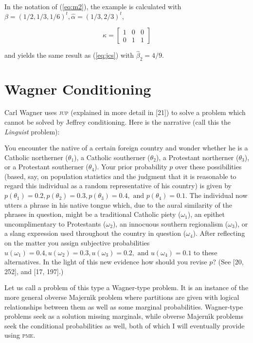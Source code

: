 {\noindent}In the notation of (\ref{eq:m2}), the example is calculated
with $\beta=(1/2,1/3,1/6)^{t},\hat{\alpha}=(1/3,2/3)^{t}$,

\begin{equation}
  \label{eq:kappa}
  \kappa=\left[
  \begin{array}{ccc}
    1 & 0 & 0 \\
    0 & 1 & 1
  \end{array}\right]
\end{equation}

{\noindent}and yields the same result as (\ref{eq:jcs}) with
$\hat{\beta}_{2}=4/9$.

\section{Wagner Conditioning}
\label{wc}

Carl Wagner uses \textsc{jup} (explained in more detail in [21]) to
solve a problem which cannot be solved by Jeffrey conditioning. Here
is the narrative (call this the \emph{Linguist} problem):

\begin{quotex}
  You encounter the native of a certain foreign country and wonder
  whether he is a Catholic northerner ($\theta_{1}$), a Catholic
  southerner ($\theta_{2}$), a Protestant northerner ($\theta_{3}$),
  or a Protestant southerner ($\theta_{4}$). Your prior probability
  $p$ over these possibilities (based, say, on population statistics
  and the judgment that it is reasonable to regard this individual as
  a random representative of his country) is given by
  $p(\theta_{1})=0.2,p(\theta_{2})=0.3,p(\theta_{3})=0.4,\mbox{ and
  }p(\theta_{4})=0.1$. The individual now utters a phrase in his
  native tongue which, due to the aural similarity of the phrases in
  question, might be a traditional Catholic piety ($\omega_{1}$), an
  epithet uncomplimentary to Protestants ($\omega_{2}$), an innocuous
  southern regionalism ($\omega_{3}$), or a slang expression used
  throughout the country in question ($\omega_{4}$). After reflecting
  on the matter you assign subjective probabilities
  $u(\omega_{1})=0.4,u(\omega_{2})=0.3,u(\omega_{3})=0.2,\mbox{ and
  }u(\omega_{4})=0.1$ to these alternatives. In the light of this new
  evidence how should you revise $p$? (See [20, 252], and [17, 197].)
\end{quotex}

Let us call a problem of this type a Wagner-type problem. It is an
instance of the more general obverse Majern{\'\i}k problem where partitions
are given with logical relationships between them as well as some
marginal probabilities. Wagner-type problems seek as a solution
missing marginals, while obverse Majern{\'\i}k problems seek the
conditional probabilities as well, both of which I will eventually
provide using \textsc{pme}.

